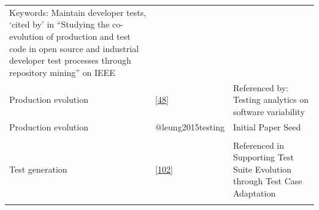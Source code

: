 \documentclass[]{book}
\begin{document}
\begin{longtable}[]{@{}lll@{}}
\begin{minipage}[t]{0.32\columnwidth}
Keywords: Maintain developer tests, `cited by' in ``Studying the
co-evolution of production and test code in open source and industrial
developer test processes through repository mining'' on IEEE\strut
\end{minipage}\tabularnewline
\begin{minipage}[t]{0.19\columnwidth}\raggedright\strut
Production evolution\strut
\end{minipage} & \begin{minipage}[t]{0.41\columnwidth}\raggedright\strut
{[}\protect\hyperlink{ref-eick2001}{48}{]}\strut
\end{minipage} & \begin{minipage}[t]{0.32\columnwidth}\raggedright\strut
Referenced by: Testing analytics on software variability\strut
\end{minipage}\tabularnewline
\begin{minipage}[t]{0.19\columnwidth}\raggedright\strut
Production evolution\strut
\end{minipage} & \begin{minipage}[t]{0.41\columnwidth}\raggedright\strut
@leung2015testing\strut
\end{minipage} & \begin{minipage}[t]{0.32\columnwidth}\raggedright\strut
Initial Paper Seed\strut
\end{minipage}\tabularnewline
\begin{minipage}[t]{0.19\columnwidth}\raggedright\strut
\strut
\end{minipage} & \begin{minipage}[t]{0.41\columnwidth}\raggedright\strut
\strut
\end{minipage} & \begin{minipage}[t]{0.32\columnwidth}\raggedright\strut
\strut
\end{minipage}\tabularnewline
\begin{minipage}[t]{0.19\columnwidth}\raggedright\strut
Test generation\strut
\end{minipage} & \begin{minipage}[t]{0.41\columnwidth}\raggedright\strut
{[}\protect\hyperlink{ref-robinson2011}{102}{]}\strut
\end{minipage} & \begin{minipage}[t]{0.32\columnwidth}\raggedright\strut
Referenced in Supporting Test Suite Evolution through Test Case
Adaptation\strut
\end{minipage}\tabularnewline
\begin{minipage}[t]{0.19\columnwidth}\raggedright\strut

\end{minipage}
\end{longtable}
\end{document}
